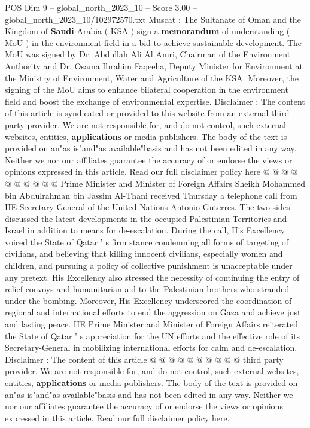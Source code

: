 \begin{textsample}{POS Dim 9 – global\_north\_2023\_10 – Score 3.00 – global\_north\_2023\_10/102972570.txt}  \label{ex:f9_pos_405}
Muscat : The Sultanate of Oman and the Kingdom of \textbf{Saudi} Arabia ( KSA ) sign a \textbf{memorandum} of understanding ( MoU ) in the environment field in a bid to achieve sustainable development.
The MoU was signed by Dr.
Abdullah Ali Al Amri, Chairman of the Environment Authority and Dr.
Osama Ibrahim Faqeeha, Deputy Minister for Environment at the Ministry of Environment, Water and Agriculture of the KSA.
Moreover, the signing of the MoU aims to enhance bilateral cooperation in the environment field and boost the exchange of environmental expertise.
Disclaimer : The content of this article is syndicated or provided to this website from an external third party provider.
We are not responsible for, and do not control, such external websites, entities, \textbf{applications} or media publishers.
The body of the text is provided on an"as is"and"as available"basis and has not been edited in any way.
Neither we nor our affiliates guarantee the accuracy of or endorse the views or opinions expressed in this article.
Read our full disclaimer policy here @ @ @ @ @ @ @ @ @ @ Prime Minister and Minister of Foreign Affairs Sheikh Mohammed bin Abdulrahman bin Jassim Al-Thani received Thursday a telephone call from HE Secretary General of the United Nations Antonio Guterres.
The two sides discussed the latest developments in the occupied Palestinian Territories and Israel in addition to means for de-escalation.
During the call, His Excellency voiced the State of Qatar ' s firm stance condemning all forms of targeting of civilians, and believing that killing innocent civilians, especially women and children, and pursuing a policy of collective punishment is unacceptable under any pretext.
His Excellency also stressed the necessity of continuing the entry of relief convoys and humanitarian aid to the Palestinian brothers who stranded under the bombing.
Moreover, His Excellency underscored the coordination of regional and international efforts to end the aggression on Gaza and achieve just and lasting peace.
HE Prime Minister and Minister of Foreign Affairs reiterated the State of Qatar ' s appreciation for the UN efforts and the effective role of its Secretary-General in mobilizing international efforts for calm and de-escalation.
Disclaimer : The content of this article @ @ @ @ @ @ @ @ @ @ third party provider.
We are not responsible for, and do not control, such external websites, entities, \textbf{applications} or media publishers.
The body of the text is provided on an"as is"and"as available"basis and has not been edited in any way.
Neither we nor our affiliates guarantee the accuracy of or endorse the views or opinions expressed in this article.
Read our full disclaimer policy here.

\end{textsample}
